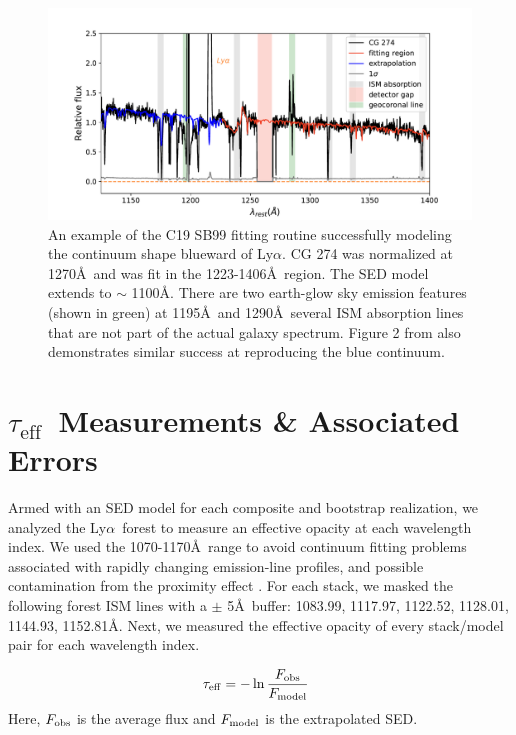 \documentclass[twocolumn,tight,times]{aastex63}
\newcommand{\mteff}{\tau_\mathrm{eff}}
\newcommand{\teff}{$\mteff$}
\newcommand{\lya}{Ly$\alpha$}
\begin{document}
\begin{figure}[ht]
    \begin{center}
    \includegraphics[scale=.5]{CG274_sb99.pdf}
    \caption{An example of the C19 SB99 fitting routine successfully modeling the continuum shape blueward of \lya. CG 274 was normalized at 1270\AA\ and was fit in the 1223-1406\AA\ region. The SED model extends to $\sim$ 1100\AA. There are two earth-glow sky emission features (shown in green) at 1195\AA\ and 1290\AA\ several ISM absorption lines that are not part of the actual galaxy spectrum. Figure 2 from \citet{Chisholm_2015} also demonstrates similar success at reproducing the blue continuum.}
    \label{fig:sb99}
    \end{center}
\end{figure}


\section{\teff\ Measurements \& Associated Errors}%
\label{sec:Effective Opacity Measurements}

Armed with an SED model for each composite and bootstrap realization, we analyzed the \lya\ forest to measure an effective opacity at each wavelength index. We used the 1070-1170\AA\ range to avoid continuum fitting problems associated with rapidly changing emission-line profiles, and possible contamination from the proximity effect \citep{Kirkman_2005}. For each stack, we masked the following forest ISM lines with a $\pm$ 5\AA\ buffer: 1083.99, 1117.97, 1122.52, 1128.01, 1144.93, 1152.81\AA. Next, we measured the effective opacity of every stack/model pair for each wavelength index. 

\begin{equation}
        \tau_{\rm eff} = -\ln \frac{F_{\rm obs}}{F_{\rm model}} \;\;
        \label{eq:teff}
\end{equation}
Here, $F_{\rm obs}$ is the average flux and $F_{\rm model}$ is the extrapolated SED. 
\end{document}
